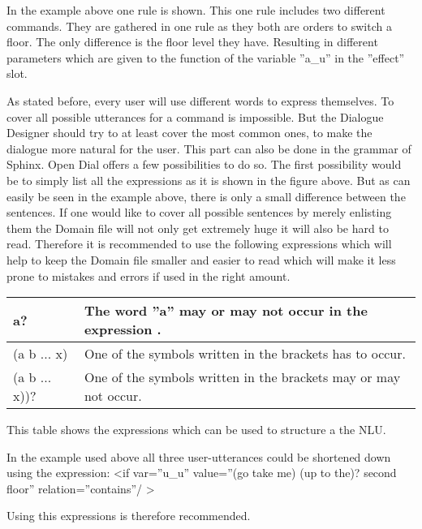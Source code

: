 In the example above one rule is shown.
This one rule includes two different commands.
They are gathered in one rule as they both are orders to switch a floor.
The only difference is the floor level they have.
Resulting in different parameters which are given to the function of the variable ”a\_u” in the ”effect” slot. \newline



As stated before, every user will use different words to express themselves.
To cover all possible utterances for a command is impossible.
But the Dialogue Designer should try to at least cover the most common ones,  to make the dialogue more natural for the user.
This part can also be done in the grammar of Sphinx.
Open Dial offers a few possibilities to do so.
The first possibility would be to simply list all the expressions as it is shown in the figure above.
But as can easily be seen in the example above, there is only a small difference between the sentences.
If one would like to cover all possible sentences by merely enlisting them the Domain file will not only get extremely huge it will also be hard to read.
Therefore it is recommended to use the following expressions which will help to keep the Domain file smaller and easier to read which will make it less prone to mistakes and errors if used in the right amount. \newline


\begin{tabular}{|ll|}
\hline
	a? & The word ”a” may or may not occur in the expression .  \\
\hline
	(a \textbar b \textbar... \textbar x) & One of the symbols written	in the brackets has to occur.\\
\hline
	(a \textbar b \textbar... \textbar x))? & One of the symbols written in the brackets may or may not occur.  \\
\hline
\end{tabular}
\newline

This table shows the expressions which can be used to structure a the NLU. \newline \newline

In the example used above all three user-utterances could be shortened down using the expression:
\textless if var=”u\_u” value=”(go \textbar take me) (up to the)?  second floor” relation=”contains”/ \textgreater

Using this expressions is therefore recommended.

